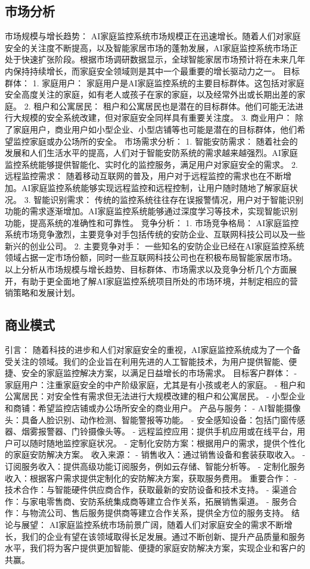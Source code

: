 \subsection{市场分析}
市场规模与增长趋势：
AI家庭监控系统市场规模正在迅速增长。随着人们对家庭安全的关注度不断提高，以及智能家居市场的蓬勃发展，AI家庭监控系统市场正处于快速扩张阶段。根据市场调研数据显示，全球智能家居市场预计将在未来几年内保持持续增长，而家庭安全领域则是其中一个最重要的增长驱动力之一。
目标群体：
1. 家庭用户： 家庭用户是AI家庭监控系统的主要目标群体。这包括对家庭安全高度关注的家庭，如有老人或孩子在家的家庭，以及经常外出或长期出差的家庭。
2. 租户和公寓居民： 租户和公寓居民也是潜在的目标群体。他们可能无法进行大规模的安全系统改建，但对家庭安全同样具有重要关注度。
3. 商业用户： 除了家庭用户，商业用户如小型企业、小型店铺等也可能是潜在的目标群体，他们希望监控家庭或办公场所的安全。
市场需求分析：
1. 智能安防需求： 随着社会的发展和人们生活水平的提高，人们对于智能安防系统的需求越来越强烈。AI家庭监控系统能够提供智能化、实时化的监控服务，满足用户对家庭安全的需求。
2. 远程监控需求： 随着移动互联网的普及，用户对于远程监控的需求也在不断增加。AI家庭监控系统能够实现远程监控和远程控制，让用户随时随地了解家庭状况。
3. 智能识别需求： 传统的监控系统往往存在误报警情况，用户对于智能识别功能的需求逐渐增加。AI家庭监控系统能够通过深度学习等技术，实现智能识别功能，提高系统的准确性和可靠性。
竞争分析：
1. 市场竞争格局： AI家庭监控系统市场竞争激烈，主要竞争对手包括传统的安防企业、互联网科技公司以及一些新兴的创业公司。
2. 主要竞争对手： 一些知名的安防企业已经在AI家庭监控系统领域占据一定市场份额，同时一些互联网科技公司也在积极布局智能家居市场。
以上分析从市场规模与增长趋势、目标群体、市场需求以及竞争分析几个方面展开，有助于更全面地了解AI家庭监控系统项目所处的市场环境，并制定相应的营销策略和发展计划。
\subsection{商业模式}
引言：
随着科技的进步和人们对家庭安全的重视，AI家庭监控系统成为了一个备受关注的领域。我们的企业旨在利用先进的人工智能技术，为用户提供智能、便捷、安全的家庭监控解决方案，以满足日益增长的市场需求。
目标客户群体：
- 家庭用户：注重家庭安全的中产阶级家庭，尤其是有小孩或老人的家庭。
- 租户和公寓居民：对安全性有需求但无法进行大规模改建的租户和公寓居民。
- 小型企业和商铺：希望监控店铺或办公场所安全的商业用户。
产品与服务：
- AI智能摄像头：具备人脸识别、动作检测、智能警报等功能。
- 安全感知设备：包括门窗传感器、烟雾报警器、门铃摄像头等。
- 远程监控应用：提供手机应用或在线平台，用户可以随时随地监控家庭状况。
- 定制化安防方案：根据用户的需求，提供个性化的家庭安防解决方案。
收入来源：
- 销售收入：通过销售设备和套装获取收入。
- 订阅服务收入：提供高级功能订阅服务，例如云存储、智能分析等。
- 定制化服务收入：根据客户需求提供定制化的安防解决方案，获取服务费用。
重要合作：
- 技术合作：与智能硬件供应商合作，获取最新的安防设备和技术支持。
- 渠道合作：与家电零售商、安防系统集成商等建立合作关系，拓展销售渠道。
- 服务合作：与物流公司、售后服务提供商等建立合作关系，提供全方位的服务支持。
结论与展望：
AI家庭监控系统市场前景广阔，随着人们对家庭安全的需求不断增长，我们的企业有望在该领域取得长足发展。通过不断创新、提升产品质量和服务水平，我们将为客户提供更加智能、便捷的家庭安防解决方案，实现企业和客户的共赢。
